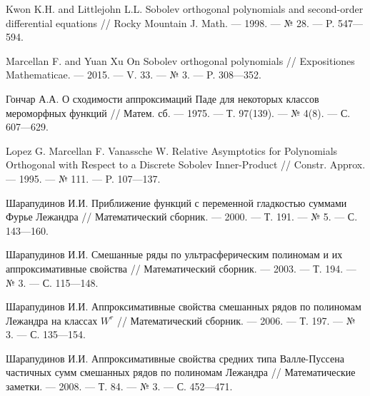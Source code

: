 \begin{thebibliography}{111}
Kwon K.H. and Littlejohn L.L. Sobolev orthogonal polynomials and second-order differential equations // Rocky Mountain J. Math. --- 1998. --- № 28. --- P. 547---594.








Marcellan F. and Yuan Xu On Sobolev orthogonal polynomials // Expositiones Mathematicae. --- 2015. --- V. 33. --- № 3. --- P. 308---352.








Гончар А.А. О сходимости аппроксимаций Паде для некоторых классов мероморфных функций // Матем. сб. --- 1975. --- Т. 97(139). --- № 4(8). --- С. 607---629.








Lopez G. Marcellan F. Vanassche W. Relative Asymptotics for Polynomials Orthogonal with Respect to a Discrete Sobolev Inner-Product // Constr. Approx. --- 1995. --- № 111. --- P. 107---137.







Шарапудинов И.И. Приближение функций с переменной гладкостью суммами Фурье Лежандра // Математический сборник. --- 2000. --- Т. 191. --- № 5. --- С. 143---160.








Шарапудинов И.И. Смешанные ряды по ультрасферическим полиномам и их аппроксимативные свойства // Математический сборник. --- 2003. --- Т. 194. --- № 3. --- С. 115---148.








Шарапудинов И.И. Аппроксимативные свойства смешанных рядов по полиномам Лежандра на классах $W^r$ // Математический сборник. --- 2006. --- Т. 197. --- № 3. --- С. 135---154.







Шарапудинов И.И. Аппроксимативные свойства средних типа Валле-Пуссена частичных сумм смешанных рядов по полиномам Лежандра // Математические заметки. --- 2008. --- Т. 84. --- № 3. --- С. 452---471.








\end{thebibliography}
